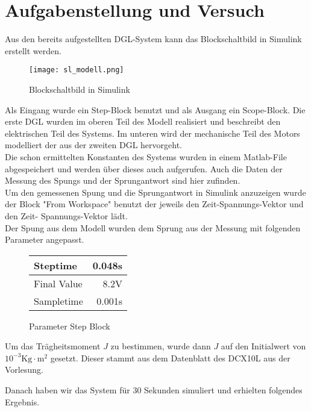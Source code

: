 \section{Aufgabenstellung und Versuch}

Aus den bereits aufgestellten DGL-System kann das Blockschaltbild in Simulink
erstellt werden.

\begin{figure}[H]
    \centering
    \texttt{[image: sl\_modell.png]}
    \caption{Blockschaltbild in Simulink}
    \label{fig:Blockschaltbild}
\end{figure}

Als Eingang wurde ein Step-Block benutzt und als Ausgang ein Scope-Block.
Die erste DGL wurden im oberen Teil des Modell realisiert und beschreibt
den elektrischen Teil des Systems. Im unteren wird der mechanische Teil
des Motors modelliert der aus der zweiten DGL hervorgeht.\\

Die schon ermittelten Konstanten des Systems wurden in einem Matlab-File
abgespeichert und werden über dieses auch aufgerufen. Auch die Daten der
Messung des Spungs und der Sprungantwort sind hier zufinden.\\

Um den gemessenen Spung und die Sprungantwort in Simulink anzuzeigen wurde der Block
"From Workspace" benutzt der jeweils den Zeit-Spannungs-Vektor und den Zeit-
Spannungs-Vektor lädt.\\

Der Spung aus dem Modell wurden dem Sprung aus der Messung mit folgenden
Parameter angepasst.\\

\begin{figure}[H]
    \centering    
    \begin{tabular}[h]{l| r}
        Steptime & 0.048s \\
        \hline
        Final Value & 8.2V \\
        \hline
        Sampletime & 0.001s \\
    \end{tabular}
    \caption{Parameter Step Block}
\end{figure}
    

Um das Trägheitsmoment $J$ zu bestimmen, wurde dann $J$ auf den Initialwert
von $10^{-3}\mathrm{Kg \cdot m^2}$ gesetzt. Dieser stammt aus dem Datenblatt
des DCX10L aus der Vorlesung.

Danach haben wir das System für 30 Sekunden simuliert und erhielten folgendes
Ergebnis.

